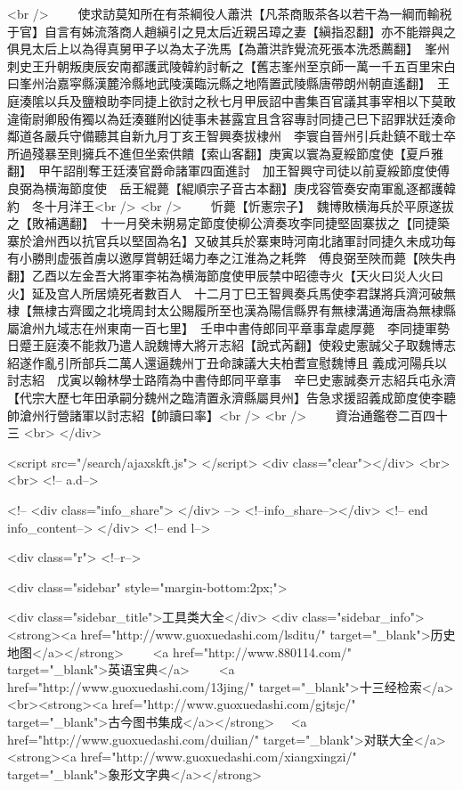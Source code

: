 <br />
　　使求訪莫知所在有茶綱役人蕭洪【凡茶商販茶各以若干為一綱而輸税于官】自言有姊流落商人趙縝引之見太后近親呂璋之妻【縝指忍翻】亦不能辯與之俱見太后上以為得真舅甲子以為太子洗馬【為蕭洪詐覺流死張本洗悉薦翻】　峯州刺史王升朝叛庚辰安南都護武陵韓約討斬之【舊志峯州至京師一萬一千五百里宋白曰峯州治嘉寜縣漢麓泠縣地武陵漢臨沅縣之地隋置武陵縣唐帶朗州朝直遙翻】　王庭湊隂以兵及鹽粮助李同捷上欲討之秋七月甲辰詔中書集百官議其事宰相以下莫敢違衛尉卿殷侑獨以為廷湊雖附凶徒事未甚露宜且含容專討同捷己巳下詔罪狀廷湊命鄰道各嚴兵守備聽其自新九月丁亥王智興奏拔棣州　李寰自晉州引兵赴鎮不戢士卒所過殘暴至則擁兵不進但坐索供饋【索山客翻】庚寅以寰為夏綏節度使【夏戶雅翻】　甲午詔削奪王廷湊官爵命諸軍四面進討　加王智興守司徒以前夏綏節度使傅良弼為横海節度使　岳王緄薨【緄順宗子音古本翻】庚戌容管奏安南軍亂逐都護韓約　冬十月洋王<br />
<br />
　　忻薨【忻憲宗子】　魏博敗横海兵於平原遂拔之【敗補邁翻】　十一月癸未朔易定節度使柳公濟奏攻李同捷堅固寨拔之【同捷築寨於滄州西以抗官兵以堅固為名】又破其兵於寨東時河南北諸軍討同捷久未成功每有小勝則虚張首虜以邀厚賞朝廷竭力奉之江淮為之耗弊　傅良弼至陜而薨【陜失冉翻】乙酉以左金吾大將軍李祐為横海節度使甲辰禁中昭德寺火【天火曰災人火曰火】延及宫人所居燒死者數百人　十二月丁巳王智興奏兵馬使李君謀將兵濟河破無棣【無棣古齊國之北境周封太公賜履所至也漢為陽信縣界有無棣溝通海唐為無棣縣屬滄州九域志在州東南一百七里】　壬申中書侍郎同平章事韋處厚薨　李同捷軍勢日蹙王庭湊不能救乃遣人說魏博大將亓志紹【說式芮翻】使殺史憲誠父子取魏博志紹遂作亂引所部兵二萬人還逼魏州丁丑命諫議大夫柏耆宣慰魏博且義成河陽兵以討志紹　戊寅以翰林學士路隋為中書侍郎同平章事　辛巳史憲誠奏亓志紹兵屯永濟【代宗大歷七年田承嗣分魏州之臨清置永濟縣屬貝州】告急求援詔義成節度使李聽帥滄州行營諸軍以討志紹【帥讀曰率】<br />
<br />
　　資治通鑑卷二百四十三  <br>
   </div> 

<script src="/search/ajaxskft.js"> </script>
 <div class="clear"></div>
<br>
<br>
 <!-- a.d-->

 <!--
<div class="info_share">
</div> 
-->
 <!--info_share--></div>   <!-- end info_content-->
  </div> <!-- end l-->

<div class="r">   <!--r-->



<div class="sidebar"  style="margin-bottom:2px;">

 
<div class="sidebar_title">工具类大全</div>
<div class="sidebar_info">
<strong><a href="http://www.guoxuedashi.com/lsditu/" target="_blank">历史地图</a></strong>　　
<a href="http://www.880114.com/" target="_blank">英语宝典</a>　　
<a href="http://www.guoxuedashi.com/13jing/" target="_blank">十三经检索</a>　
<br><strong><a href="http://www.guoxuedashi.com/gjtsjc/" target="_blank">古今图书集成</a></strong>　
<a href="http://www.guoxuedashi.com/duilian/" target="_blank">对联大全</a>　<strong><a href="http://www.guoxuedashi.com/xiangxingzi/" target="_blank">象形文字典</a></strong>　

